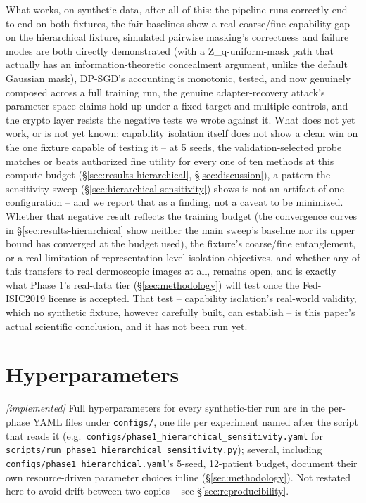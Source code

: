 \documentclass[11pt]{article}
\newcommand{\status}[1]{\textit{[#1]}}
\begin{document}
What works, on synthetic data, after all of this: the pipeline runs
correctly end-to-end on both fixtures, the fair baselines show a real
coarse/fine capability gap on the hierarchical fixture, simulated pairwise
masking's correctness and failure modes are both directly demonstrated
(with a Z\_q-uniform-mask path that actually has an information-theoretic
concealment argument, unlike the default Gaussian mask), DP-SGD's
accounting is monotonic, tested, and now genuinely composed across a full
training run, the genuine adapter-recovery attack's parameter-space claims
hold up under a fixed target and multiple controls, and the crypto layer
resists the negative tests we wrote against it. What does not yet work, or
is not yet known: capability isolation itself does not show a clean win on
the one fixture capable of testing it -- at 5 seeds, the validation-selected
probe matches or beats authorized fine utility for every one of ten methods
at this compute budget (\S\ref{sec:results-hierarchical},
\S\ref{sec:discussion}), a pattern the sensitivity sweep
(\S\ref{sec:hierarchical-sensitivity}) shows is not an artifact of one
configuration -- and we report that as a finding, not a caveat to be
minimized. Whether that negative result reflects the training budget (the
convergence curves in \S\ref{sec:results-hierarchical} show neither the
main sweep's baseline nor its upper bound has converged at the budget
used), the fixture's coarse/fine entanglement, or a real limitation of
representation-level isolation objectives, and whether any of this
transfers to real dermoscopic images at all, remains open, and is exactly
what Phase 1's real-data tier (\S\ref{sec:methodology}) will test once the
Fed-ISIC2019 license is accepted. That test -- capability isolation's
real-world validity, which no synthetic fixture, however carefully built,
can establish -- is this paper's actual scientific conclusion, and it has
not been run yet.




\appendix
\section{Hyperparameters}
\status{implemented} Full hyperparameters for every synthetic-tier run are
in the per-phase YAML files under \texttt{configs/}, one file per
experiment named after the script that reads it (e.g.\
\texttt{configs/phase1\_hierarchical\_sensitivity.yaml} for
\texttt{scripts/run\_phase1\_hierarchical\_sensitivity.py}); several,
including \texttt{configs/phase1\_hierarchical.yaml}'s 5-seed, 12-patient
budget, document their own resource-driven parameter choices inline
(\S\ref{sec:methodology}). Not restated here to avoid drift between two
copies -- see \S\ref{sec:reproducibility}.
\end{document}
